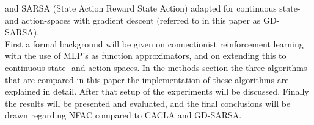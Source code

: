 \cite{van2007reinforcement}
and SARSA (State Action Reward State Action) adapted for continuous state- and action-spaces \cite{nichols2014application} with gradient descent (referred to in this paper as GD-SARSA). \\
First a formal background will be given on connectionist reinforcement learning with the use of MLP's as function approximators,
and on extending this to continuous state- and action-spaces. In the methods section the three algorithms that are compared
 in this paper the implementation of these algorithms are explained in detail. After that setup of the experiments will be discussed.
Finally the results will be presented and evaluated, and the final conclusions will be drawn regarding NFAC compared to CACLA and GD-SARSA.
